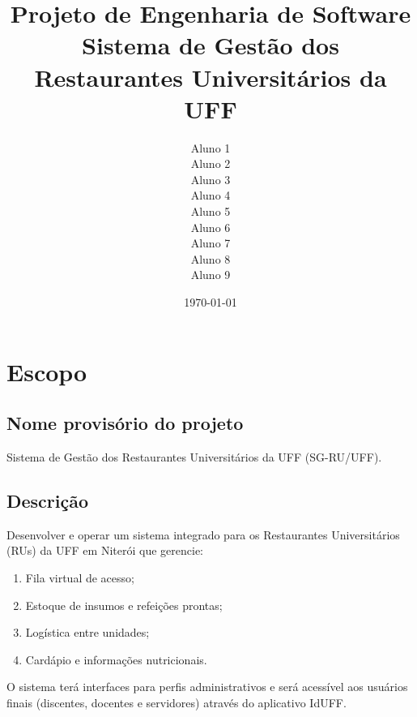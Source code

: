 \documentclass[12pt,a4paper]{article}
\begin{document}
\title{Projeto de Engenharia de Software \\ \large Sistema de Gestão dos Restaurantes Universitários da UFF}
\author{
    Aluno 1 \\ 
    Aluno 2 \\ 
    Aluno 3 \\ 
    Aluno 4 \\ 
    Aluno 5 \\ 
    Aluno 6 \\ 
    Aluno 7 \\ 
    Aluno 8 \\ 
    Aluno 9
}
\date{\today}

\maketitle

\tableofcontents
\newpage

\section{Escopo}

\subsection{Nome provisório do projeto}
Sistema de Gestão dos Restaurantes Universitários da UFF (SG-RU/UFF).



\subsection{Descrição}
Desenvolver e operar um sistema integrado para os Restaurantes Universitários (RUs) da UFF em Niterói que gerencie:
\begin{enumerate}
    \item Fila virtual de acesso;
    \item Estoque de insumos e refeições prontas;
    \item Logística entre unidades;
    \item Cardápio e informações nutricionais.
\end{enumerate}
O sistema terá interfaces para perfis administrativos e será acessível aos usuários finais (discentes, docentes e servidores) através do aplicativo IdUFF.

\end{document}
